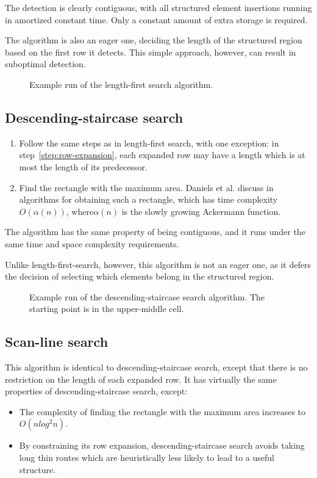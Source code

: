 The detection is clearly contiguous, with all structured element insertions running in amortized constant time. Only a constant amount of extra storage is required.

The algorithm is also an eager one, deciding the length of the structured region based on the first row it detects. This simple approach, however, can result in suboptimal detection.

\begin{figure}[H]
\drawmatrix[cell wd=0.6, cell ht=0.6]{\lengthsearchmatrix}
\caption{Example run of the length-first search algorithm.}
\end{figure}


\subsection{Descending-staircase search}
\begin{enumerate}
\item Follow the same steps as in length-first search, with one exception: in step~\ref{step:row-expansion}, each expanded row may have a length which is at most the length of its predecessor.
\item Find the rectangle with the maximum area. Daniels et al. discuss in~\cite{daniels1997finding} algorithms for obtaining such a rectangle, which has time complexity $O(\alpha(n))$, where$\alpha(n)$ is the slowly growing Ackermann function.
\end{enumerate}

The algorithm has the same property of being contiguous, and it runs under the same time and space complexity requirements.

Unlike length-first-search, however, this algorithm is not an eager one, as it defers the decision of selecting which elements belong in the structured region.

\begin{figure}[H]
\drawmatrix[cell wd=0.6, cell ht=0.6]{\stairsearchmatrix}
\caption{Example run of the descending-staircase search algorithm. The starting point is in the upper-middle cell.}
\end{figure}


\subsection{Scan-line search}
This algorithm is identical to descending-staircase search, except that there is no restriction on the length of each expanded row. It has virtually the same properties of descending-staircase search, except:
\begin{itemize}
\item The complexity of finding the rectangle with the maximum area increases to $O(n log^2 n)$.
\item By constraining its row expansion, descending-staircase search avoids taking long thin routes which are heuristically less likely to lead to a useful structure.
\end{itemize}

